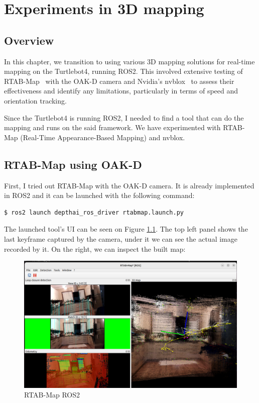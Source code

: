 \chapter{Experiments in 3D mapping} \label{experiments_3d_mapping}

\section{Overview}

In this chapter, we transition to using various 3D mapping solutions for real-time mapping on the Turtlebot4, running ROS2. This involved extensive testing of RTAB-Map~\cite{RTAB_Map_docs} with the OAK-D camera and Nvidia's nvblox~\cite{nvblox_docs} to assess their effectiveness and identify any limitations, particularly in terms of speed and orientation tracking.

Since the Turtlebot4 is running ROS2, I needed to find a tool that can do the mapping and runs on the said framework. We have experimented with RTAB-Map (Real-Time Appearance-Based Mapping) and nvblox.


\section{RTAB-Map using OAK-D} \label{experiments_rtab_map}
First, I tried out RTAB-Map with the OAK-D camera. It is already implemented in ROS2 and it can be launched with the following command:
\FloatBarrier
\begin{lstlisting}[language=bash,frame=single,float=!ht]
$ ros2 launch depthai_ros_driver rtabmap.launch.py
\end{lstlisting}

The launched tool's UI can be seen on Figure \ref{fig:rtabmap_ros}. The top left panel shows the last keyframe captured by the camera, under it we can see the actual image recorded by it. On the right, we can inspect the built map:

\begin{figure}[htbp]
	\centering
	\includegraphics[width=150mm, keepaspectratio]{figures/rtabmap_ros.png}
	\caption{RTAB-Map ROS2}
	\label{fig:rtabmap_ros}
\end{figure}

